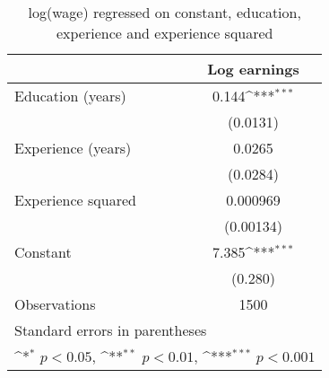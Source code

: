 \begin{table}[htbp]\centering
\def\sym#1{\ifmmode^{#1}\else\(^{#1}\)\fi}
\caption{log(wage) regressed on constant, education, experience and experience squared}
\begin{tabular}{l*{1}{c}}
\hline\hline
                    &\multicolumn{1}{c}{Log earnings}\\
\hline
Education (years)   &       0.144\sym{***}\\
                    &    (0.0131)         \\
[1em]
Experience (years)  &      0.0265         \\
                    &    (0.0284)         \\
[1em]
Experience squared  &    0.000969         \\
                    &   (0.00134)         \\
[1em]
Constant            &       7.385\sym{***}\\
                    &     (0.280)         \\
\hline
Observations        &        1500         \\
\hline\hline
\multicolumn{2}{l}{\footnotesize Standard errors in parentheses}\\
\multicolumn{2}{l}{\footnotesize \sym{*} \(p<0.05\), \sym{**} \(p<0.01\), \sym{***} \(p<0.001\)}\\
\end{tabular}
\end{table}

